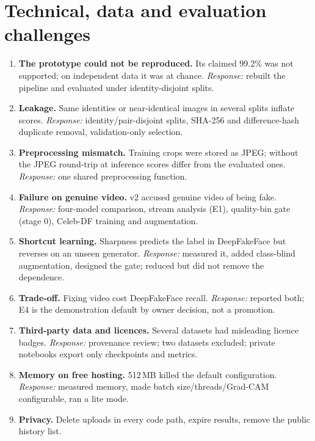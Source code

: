 \documentclass[11pt,a4paper]{report}
\begin{document}
\section{Technical, data and evaluation challenges}
\begin{enumerate}
\item \textbf{The prototype could not be reproduced.} Its claimed 99.2\% was not supported; on independent data it was at chance. \emph{Response:} rebuilt the pipeline and evaluated under identity-disjoint splits.
\item \textbf{Leakage.} Same identities or near-identical images in several splits inflate scores. \emph{Response:} identity/pair-disjoint splits, SHA-256 and difference-hash duplicate removal, validation-only selection.
\item \textbf{Preprocessing mismatch.} Training crops were stored as JPEG; without the JPEG round-trip at inference scores differ from the evaluated ones. \emph{Response:} one shared preprocessing function.
\item \textbf{Failure on genuine video.} v2 accused genuine video of being fake. \emph{Response:} four-model comparison, stream analysis (E1), quality-bin gate (stage 0), Celeb-DF training and augmentation.
\item \textbf{Shortcut learning.} Sharpness predicts the label in DeepFakeFace but reverses on an unseen generator. \emph{Response:} measured it, added class-blind augmentation, designed the gate; reduced but did not remove the dependence.
\item \textbf{Trade-off.} Fixing video cost DeepFakeFace recall. \emph{Response:} reported both; E4 is the demonstration default by owner decision, not a promotion.
\item \textbf{Third-party data and licences.} Several datasets had misleading licence badges. \emph{Response:} provenance review; two datasets excluded; private notebooks export only checkpoints and metrics.
\item \textbf{Memory on free hosting.} 512\,MB killed the default configuration. \emph{Response:} measured memory, made batch size/threads/Grad-CAM configurable, ran a lite mode.
\item \textbf{Privacy.} Delete uploads in every code path, expire results, remove the public history list.
\end{enumerate}
\end{document}

